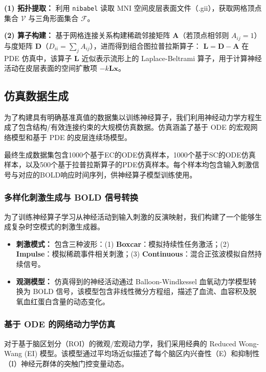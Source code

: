 \documentclass[12pt,a4paper]{article}
\begin{document}
\noindent\textbf{(1) 拓扑提取：} 利用 \texttt{nibabel} 读取 MNI 空间皮层表面文件（.gii），获取网格顶点集合 $\mathcal{V}$ 与三角形面集合 $\mathcal{F}$。

\noindent\textbf{(2) 算子构建：} 基于网格连接关系构建稀疏邻接矩阵 $\mathbf{A}$（若顶点相邻则 $A_{ij}=1$）与度矩阵 $\mathbf{D}$（$D_{ii} = \sum_{j} A_{ij}$），进而得到组合图拉普拉斯算子：
\(
\mathbf{L} = \mathbf{D} - \mathbf{A}
\)
在 PDE 仿真中，该算子 $\mathbf{L}$ 近似表示流形上的 Laplace-Beltrami 算子，用于计算神经活动在皮层表面的空间扩散项 $-k \mathbf{L} \mathbf{x}$。

\subsection{仿真数据生成}
为了构建具有明确基准真值的数据集以训练神经算子，我们利用神经动力学方程生成了包含结构/有效连接约束的大规模仿真数据。仿真涵盖了基于 ODE 的宏观网络模型和基于 PDE 的皮层连续场模型。

最终生成数据集包含1000个基于EC的ODE仿真样本，1000个基于SC的ODE仿真样本，以及500个基于拉普拉斯算子的PDE仿真样本。每个样本均包含输入刺激信号与对应的BOLD响应时间序列，供神经算子模型训练使用。

\subsubsection{多样化刺激生成与 BOLD 信号转换}
为了训练神经算子学习从神经活动到输入刺激的反演映射，我们构建了一个能够生成复杂时空模式的刺激生成器。
\begin{itemize}
    \item \textbf{刺激模式：} 包含三种波形：(1) \textbf{Boxcar}：模拟持续性任务激活；(2) \textbf{Impulse}：模拟稀疏事件相关刺激；(3) \textbf{Continuous}：混合正弦波模拟自然持续信号。
    \item \textbf{观测模型：} 仿真得到的神经活动通过 Balloon-Windkessel 血氧动力学模型转换为 BOLD 信号，该模型包含非线性微分方程组，描述了血流、血容积及脱氧血红蛋白含量的动态变化\cite{dcm}。
\end{itemize}
\subsubsection{基于 ODE 的网络动力学仿真}
对于基于脑区划分（ROI）的微观/宏观动力学，我们采用经典的 Reduced Wong-Wang (EI) 模型\cite{deco2014}。该模型通过平均场近似描述了每个脑区内兴奋性（E）和抑制性（I）神经元群体的突触门控变量动态。
\end{document}
